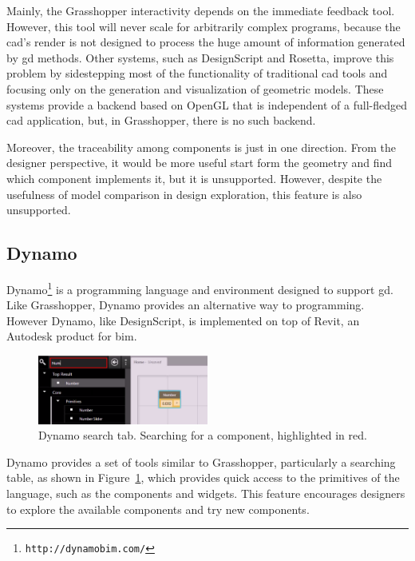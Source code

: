 Mainly, the Grasshopper interactivity depends on the immediate feedback tool. However, this tool will never scale for arbitrarily complex programs, because the \gls{cad}'s render is not designed to process the huge amount of information generated by \gls{gd} methods. Other systems, such as DesignScript and Rosetta, improve this problem by sidestepping most of the functionality of traditional \gls{cad} tools and focusing only on the generation and visualization of geometric models. These systems provide a backend based on OpenGL that is independent of a full-fledged \gls{cad} application, but, in Grasshopper, there is no such backend.

Moreover, the traceability among components is just in one direction. From the designer perspective, it would be more useful start form the geometry and find which component implements it, but it is unsupported. However, despite the usefulness of model comparison in design exploration, this feature is also unsupported.
\subsection{Dynamo}
\label{subsed:dynamo}
Dynamo\footnote{\texttt{http://dynamobim.com/}} is a programming language and environment designed to support \gls{gd}. Like Grasshopper, Dynamo provides an alternative way to programming. However Dynamo, like DesignScript, is implemented on top of Revit, an Autodesk product for \gls{bim}.

\begin{figure}
  \begin{center}
    \includegraphics[width=0.5\textwidth]{images/dynam-tab}
  \end{center}
 \caption{Dynamo search tab. Searching for a component, highlighted in red.}  
    \label{fig:dynam}
\end{figure}

Dynamo provides a set of tools similar to Grasshopper, particularly a searching table, as shown in Figure~\ref{fig:dynam}, which provides quick access to the primitives of the language, such as the components and widgets. This feature encourages designers to explore the available components and try new components.


